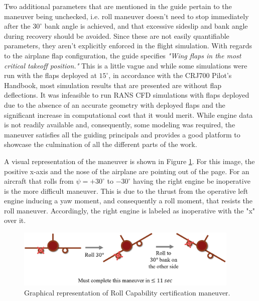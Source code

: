 Two additional parameters that are mentioned in the guide pertain to the maneuver being unchecked, i.e. roll maneuver doesn't need to stop immediately after the $30 ^\circ$ bank angle is achieved, and that excessive sideslip and bank angle during recovery should be avoided.
Since these are not easily quantifiable parameters, they aren't explicitly enforced in the flight simulation.
With regards to the airplane flap configuration, the guide specifies \textit{"Wing flaps in the most critical takeoff position."}
This is a little vague and while some simulations were run with the flaps deployed at $15^\circ$, in accordance with the CRJ700 Pilot's Handbook, most simulation results that are presented are without flap deflections. 
It was infeasible to run RANS CFD simulations with flaps deployed due to the absence of an accurate geometry with deployed flaps and the significant increase in computational cost that it would merit.  
While engine data is not readily available and, consequently, some modeling was required, the maneuver satisfies all the guiding principals and provides a good platform to showcase the culmination of all the different parts of the work.

A visual representation of the maneuver is shown in Figure \ref{fig:roll_maneuver}. 
For this image, the positive x-axis and the nose of the airplane are pointing out of the page.
For an aircraft that rolls from $\psi = +30^\circ$ to $-30^\circ$ having the right engine be inoperative is the more difficult maneuver.
This is due to the thrust from the operative left engine inducing a yaw moment, and consequently a roll moment, that resists the roll maneuver.
Accordingly, the right engine is labeled as inoperative with the "x" over it.

\begin{figure}
    \center
    \includegraphics[width=0.95\textwidth]{suthesis/images/roll_maneuver.png}
    \caption{Graphical representation of Roll Capability certification maneuver. \label{fig:roll_maneuver}}
\end{figure}